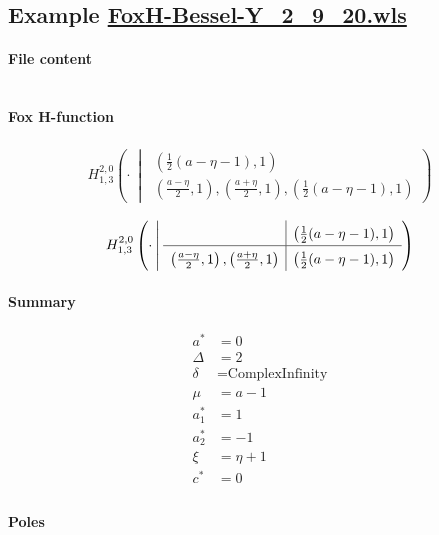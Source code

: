 \documentclass[preview]{standalone}
\newcommand{\FoxH}[5]{H_{#2}^{#1}\left(#3\:\middle\vert\: \begin{array}{l}#4\\[0.4em] #5\end{array}\right)}
\begin{document}
\subsection{Example \url{FoxH-Bessel-Y_2_9_20.wls}}

\paragraph{File content}

\inputminted{text}{../Examples/FoxH-Bessel-Y_2_9_20.wls}

\paragraph{Fox H-function}

\begin{align*}
  \FoxH
    {2,0}
    {1,3}
    {\cdot}
    {\left(\frac{1}{2} (a-\eta -1), 1\right)}
    {\left(\frac{a-\eta }{2}, 1\right), \left(\frac{a+\eta }{2}, 1\right), \left(\frac{1}{2} (a-\eta -1), 1\right)}
\end{align*}

\begin{align*}
  \FoxHext
    {2,0}
    {1,3}
    {\cdot}
    {}
    {\left(\frac{1}{2} (a-\eta -1), 1\right)}
    {\left(\frac{a-\eta }{2}, 1\right), \left(\frac{a+\eta }{2}, 1\right)}
    {\left(\frac{1}{2} (a-\eta -1), 1\right)}
\end{align*}

\paragraph{Summary}

\begin{align*}
  a^*    & = 0 \\
  \Delta & = 2 \\
  \delta & = \text{ComplexInfinity} \\
  \mu    & = a-1 \\
  a_1^*  & = 1 \\
  a_2^*  & = -1 \\
  \xi    & = \eta +1 \\
  c^*    & = 0 \\
\end{align*}

\paragraph{Poles}
\end{document}
